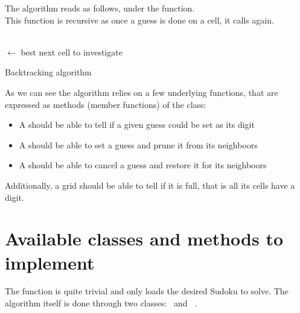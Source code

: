 \documentclass{ecnreport}
\begin{document}
The algorithm reads as follows, under the  function.\\
This function is recursive as once a guess is done on a cell, it calls  again.

 \begin{algorithm}[!h]
 \DontPrintSemicolon
 \;
 \Fill{}
 {
 \\
 $\gets$ best next cell to investigate\;
\Return {}\;
}

\caption{Backtracking algorithm}
\label{backtracking}
\end{algorithm}

As we can see the algorithm relies on a few underlying functions, that are expressed as methods (member functions) of the  class:

\begin{itemize}
 \item A  should be able to tell if a given guess could be set as its digit
 \item A  should be able to set a guess and prune it from its neighboors
 \item A  should be able to cancel a guess and restore it for its neighboors
\end{itemize}

Additionally, a grid should be able to tell if it is full, that is all its cells have a digit.

\newpage
\section{Available classes and methods to implement}

\def\Grid{\okt{Grid}~}
\def\Cell{\okt{Cell}~}

The  function is quite trivial and only loads the desired Sudoku to solve. The algorithm itself is done through two classes: \Grid and \Cell.
\end{document}

